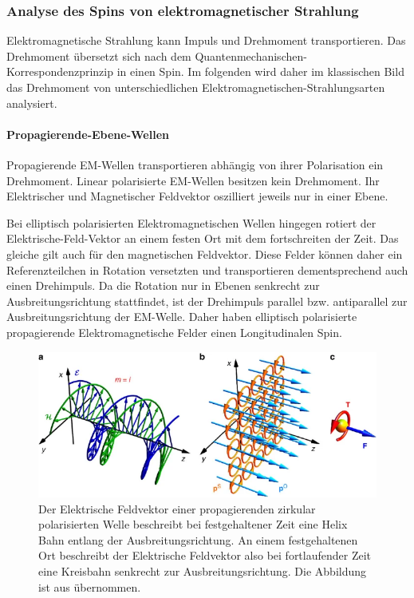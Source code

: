 \documentclass[titlepage]{article}
\begin{document}
	
		
	\subsubsection{Analyse des Spins von elektromagnetischer Strahlung}
	Elektromagnetische Strahlung kann Impuls und Drehmoment transportieren. Das Drehmoment übersetzt sich nach dem Quantenmechanischen-Korrespondenzprinzip in einen Spin. Im folgenden wird daher im klassischen Bild das Drehmoment von unterschiedlichen Elektromagnetischen-Strahlungsarten analysiert.
	\paragraph{Propagierende-Ebene-Wellen}
		Propagierende EM-Wellen transportieren abhängig von ihrer Polarisation ein Drehmoment. Linear polarisierte EM-Wellen besitzen kein Drehmoment. Ihr Elektrischer und Magnetischer Feldvektor oszilliert jeweils nur in einer Ebene.
		 
		Bei elliptisch polarisierten Elektromagnetischen Wellen hingegen rotiert der Elektrische-Feld-Vektor an einem festen Ort mit dem fortschreiten der Zeit. Das gleiche gilt auch für den magnetischen Feldvektor. Diese Felder können daher ein Referenzteilchen in Rotation versetzten und transportieren dementsprechend auch einen Drehimpuls. Da die Rotation nur in Ebenen senkrecht zur Ausbreitungsrichtung stattfindet, ist der Drehimpuls parallel bzw. antiparallel zur Ausbreitungsrichtung der EM-Welle. Daher haben elliptisch polarisierte propagierende Elektromagnetische Felder einen Longitudinalen Spin.
		
		\begin{figure}[h]
			\centering
			\includegraphics[width=0.7\linewidth]{figures/spin/prop_spin}
			\caption{Der Elektrische Feldvektor einer propagierenden zirkular polarisierten Welle beschreibt bei festgehaltener Zeit eine Helix Bahn entlang der Ausbreitungsrichtung. An einem festgehaltenen Ort beschreibt der Elektrische Feldvektor also bei fortlaufender Zeit eine Kreisbahn senkrecht zur Ausbreitungsrichtung. Die Abbildung ist aus \cite{Bliokh.2014} übernommen.}
			\label{fig:prop_spin}
		\end{figure}
		
\end{document}

